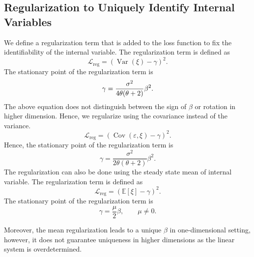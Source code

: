 \documentclass[11pt]{article}
\begin{document}
\subsection{Regularization to Uniquely Identify Internal Variables}
We define a regularization term that is added to the loss function to fix the identifiability of the internal variable. The regularization term is defined as
\begin{equation}
    \mathcal{L}_{\mathrm{reg}} = (\operatorname{Var}(\xi) - \gamma)^2.
\end{equation}
The stationary point of the regularization term is
\begin{equation}
    \gamma = \dfrac{\sigma^2}{4\theta(\theta+2)}\beta^2.\\
\end{equation}
The above equation does not distinguish between the sign of $\beta$ or rotation in higher dimension. Hence, we regularize using the covariance instead of the variance.
\begin{equation}
    \mathcal{L}_{\mathrm{reg}} = (\operatorname{Cov}(\varepsilon,\xi) - \gamma)^2.
\end{equation}
Hence, the stationary point of the regularization term is
\begin{equation}
    \gamma = \dfrac{\sigma^2}{2\theta(\theta+2
        )}\beta^2.
\end{equation}
The regularization can also be done using the steady state mean of internal variable. The regularization term is defined as
\begin{equation}
    \mathcal{L}_{\mathrm{reg}} = (\mathbb{E}[\xi] - \gamma)^2.
\end{equation}
The stationary point of the regularization term is
\begin{equation}
    \gamma = \dfrac{\mu}{2}\beta,\qquad \mu \neq 0.
\end{equation}

Moreover, the mean regularization leads to a unique $\beta$ in one-dimensional setting, however, it does not guarantee uniqueness in higher dimensions as the linear system is overdetermined.
\end{document}
